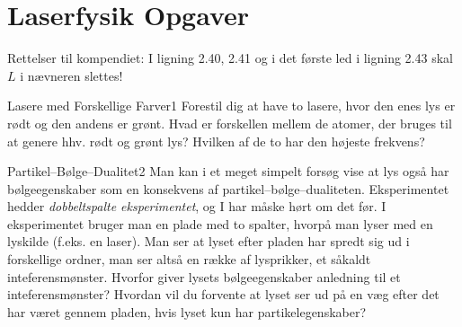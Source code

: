 

\chapter{Laserfysik Opgaver}

Rettelser til kompendiet: I ligning 2.40, 2.41 og i det første led i ligning 2.43 skal $L$ i nævneren slettes! 

\begin{opgave}{Lasere med Forskellige Farver}{1}
Forestil dig at have to lasere, hvor den enes lys er rødt og den andens er grønt. 
\opg Hvad er forskellen mellem de atomer, der bruges til at genere hhv. rødt og grønt lys?
\opg Hvilken af de to har den højeste frekvens?
\end{opgave}

\begin{opgave}{Partikel--Bølge--Dualitet}{2}
Man kan i et meget simpelt forsøg vise at lys også har bølgeegenskaber som en konsekvens af partikel--bølge--dualiteten. Eksperimentet hedder \emph{dobbeltspalte eksperimentet}, og I har måske hørt om det før. I eksperimentet bruger man en plade med to spalter, hvorpå man lyser med en lyskilde (f.eks. en laser). Man ser at lyset efter pladen har spredt sig ud i forskellige ordner, man ser altså en række af lysprikker, et såkaldt inteferensmønster. 
\opg Hvorfor giver lysets bølgeegenskaber anledning til et inteferensmønster?
\opg Hvordan vil du forvente at lyset ser ud på en væg efter det har været gennem pladen, hvis lyset kun har partikelegenskaber? 
\end{opgave}

